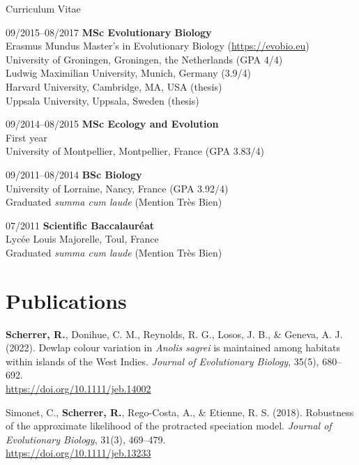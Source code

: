 \documentclass[11pt,a4paper]{article}
\begin{document}
\begin{cv}{Curriculum Vitae}
\begin{cvlist}{}
			\item[09/2015--08/2017] 
			\textbf{MSc Evolutionary Biology}\\
			Erasmus Mundus Master's in Evolutionary Biology (\url{https://evobio.eu})\\
			University of Groningen, Groningen, the Netherlands (GPA 4/4)\\
			Ludwig Maximilian University, Munich, Germany (3.9/4)\\
			Harvard University, Cambridge, MA, USA (thesis)\\
			Uppsala University, Uppsala, Sweden (thesis)
			
			\item[09/2014--08/2015] 
			\textbf{MSc Ecology and Evolution}\\
			First year\\
			University of Montpellier, Montpellier, France (GPA 3.83/4)
			
			\item[09/2011--08/2014] 
			\textbf{BSc Biology}\\
			University of Lorraine, Nancy, France (GPA 3.92/4)\\
			Graduated \textit{summa cum laude} (Mention Tr\`{e}s Bien)
			 
			\item[07/2011] 
			\textbf{Scientific Baccalaur\'{e}at}\\
			Lyc\'{e}e Louis Majorelle, Toul, France\\
			Graduated \textit{summa cum laude} (Mention Tr\`{e}s Bien)
			
		\end{cvlist}
	
		\section{Publications}
		
		\begin{cvlist}{}
			
			\item \textbf{Scherrer, R.}, Donihue, C. M., Reynolds, R. G., Losos, J. B., \& Geneva, A. J. (2022). Dewlap colour variation in \textit{Anolis sagrei} is maintained among habitats within islands of the West Indies. \textit{Journal of Evolutionary Biology}, 35(5), 680–692.\\ \url{https://doi.org/10.1111/jeb.14002}
			
			\item Simonet, C., \textbf{Scherrer, R.}, Rego-Costa, A., \& Etienne, R. S. (2018). Robustness of the approximate likelihood of the protracted speciation model. \textit{Journal of Evolutionary Biology}, 31(3), 469–479.\\ \url{https://doi.org/10.1111/jeb.13233}
			

\end{cvlist}
\end{cv}
\end{document}
